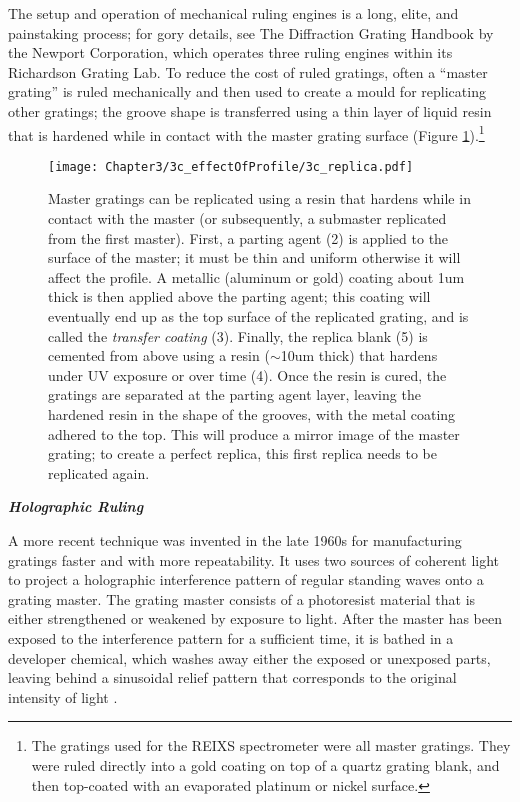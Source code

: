 The setup and operation of mechanical ruling engines is a long, elite, and painstaking process; for gory details, see The Diffraction Grating Handbook \cite{Pal05} by the Newport Corporation, which operates three ruling engines within its Richardson Grating Lab.  To reduce the cost of ruled gratings, often a ``master grating'' is ruled mechanically and then used to create a mould for replicating other gratings; the groove shape is transferred using a thin layer of liquid resin that is hardened while in contact with the master grating surface (Figure \ref{3c-replication}).\footnote{The gratings used for the REIXS spectrometer were all master gratings. They were ruled directly into a gold coating on top of a quartz grating blank, and then top-coated with an evaporated platinum or nickel surface.}

\begin{figure}[htbp] %
   \centering
   \texttt{[image: Chapter3/3c\_effectOfProfile/3c\_replica.pdf]}
   \caption[Master gratings can be replicated using a resin that hardens while in contact with the master (or subsequently, a submaster replicated from the first master).]{Master gratings can be replicated using a resin that hardens while in contact with the master (or subsequently, a submaster replicated from the first master).  First, a parting agent (2) is applied to the surface of the master; it must be thin and uniform otherwise it will affect the profile.  A metallic (aluminum or gold) coating about 1um thick is then applied above the parting agent; this coating will eventually end up as the top surface of the replicated grating, and is called the \emph{transfer coating} (3).  Finally, the replica blank (5) is cemented from above using a resin ($\sim$10um thick) that hardens under UV exposure or over time (4).  Once the resin is cured, the gratings are separated at the parting agent layer, leaving the hardened resin in the shape of the grooves, with the metal coating adhered to the top.  This will produce a mirror image of the master grating; to create a perfect replica, this first replica needs to be replicated again.}
   \label{3c-replication}
\end{figure}

\noindent \textbf{\emph{Holographic Ruling}}

\noindent A more recent technique was invented in the late 1960s for manufacturing gratings faster and with more repeatability.  It uses two sources of coherent light to project a  holographic interference pattern of regular standing waves onto a grating master.  The grating master consists of a photoresist material that is either strengthened or weakened by exposure to light.  After the master has been exposed to the interference pattern for a sufficient time, it is bathed in a developer chemical, which washes away either the exposed or unexposed parts, leaving behind a sinusoidal relief pattern that corresponds to the original intensity of light \cite{Lin82}.

